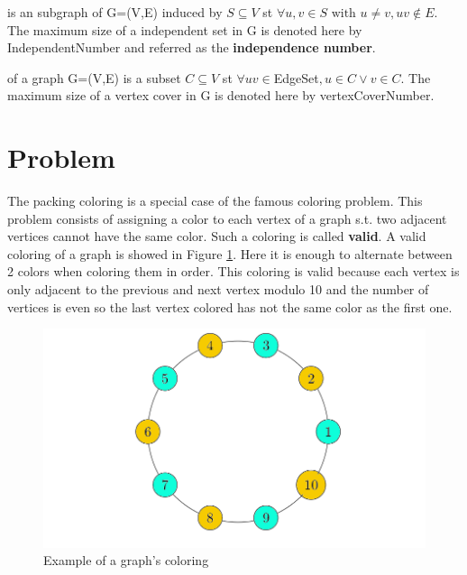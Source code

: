 \begin{mydef}
\label{def:independent}
 is an subgraph of G=(V,E) induced by $S \subseteq V $  \acrshort{st} $\forall u,v \in S \text{ with } u \neq v, uv \notin E$. The maximum size of a independent set in G is denoted here by \gls{IndependentNumber} and referred as the \textbf{independence number}.
\end{mydef}

\begin{mydef}
\label{def:vertexCover}
 of a graph G=(V,E) is a subset $C \subseteq V$ \acrshort{st} $\forall uv \in $\gls{EdgeSet}$, u \in C \lor v \in C$. The maximum size of a vertex cover in G is denoted here by \gls{vertexCoverNumber}.
\end{mydef}

\section{Problem}

The packing coloring is a special case of the famous coloring problem. This problem consists of assigning a color to each vertex of a graph s.t. two adjacent vertices cannot have the same color. Such a coloring is called \textbf{valid}. A  valid coloring of a graph is showed in Figure \ref{fig:graphColored}. Here it is enough to alternate between 2 colors when coloring them in order. This coloring is valid because each vertex is only adjacent to the previous and next vertex modulo 10 and the number of vertices is even so the last vertex colored has not the same color as the first one.

\begin{figure}[h]
\centering
\includegraphics[scale=0.3]{figures/graphColored.png}
\caption{Example of a graph's coloring }
\label{fig:graphColored}
\end{figure}

